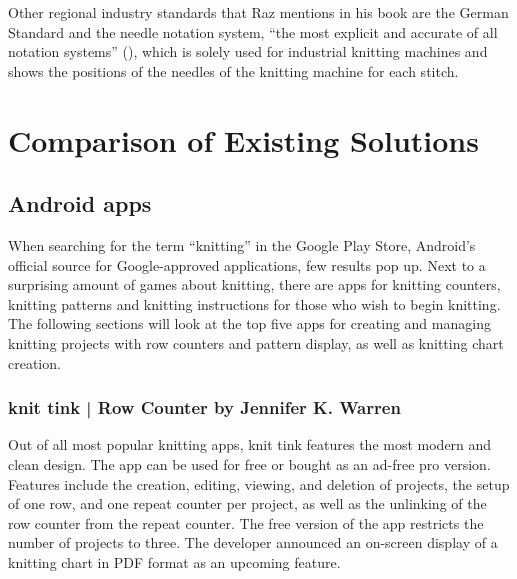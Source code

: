 Other regional industry standards that Raz mentions in his book are the German Standard and the needle notation system, ``the most explicit and accurate of all  notation systems'' (\cite[p58]{Raz1993}), which is solely used for industrial knitting machines and shows the positions of the needles of the knitting machine for each stitch.

\section{Comparison of Existing Solutions}

\subsection{Android apps}
When searching for the term ``knitting'' in the Google Play Store, Android’s official source for Google-approved applications, few results pop up. Next to a surprising amount of games about knitting, there are apps for knitting counters, knitting patterns and knitting instructions for those who wish to begin knitting. The following sections will look at the top five apps for creating and managing knitting projects with row counters and pattern display, as well as knitting chart creation.

\subsubsection*{knit tink | Row Counter by Jennifer K. Warren}
Out of all most popular knitting apps, knit tink features the most modern and clean design. The app can be used for free or bought as an ad-free pro version. Features include the creation, editing, viewing, and deletion of projects, the setup of one row, and one repeat counter per project, as well as the unlinking of the row counter from the repeat counter. The free version of the app restricts the number of projects to three. The developer announced an on-screen display of a knitting chart in PDF format as an upcoming feature.

